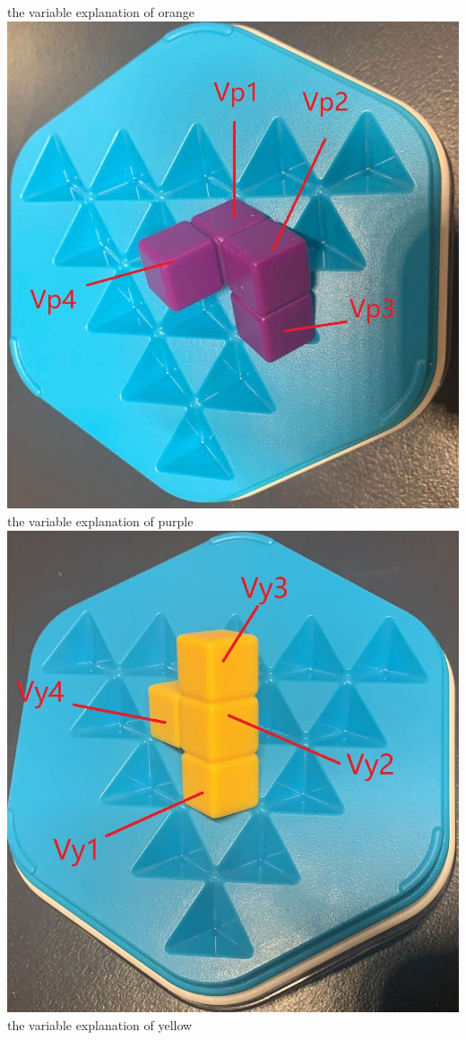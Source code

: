 \begin{center}
the variable explanation of orange\\
\includegraphics[scale=0.2]{figs/3Dpurple.jpg}\\
the variable explanation of purple\\
\includegraphics[scale=0.2]{figs/3Dyellow.jpg}\\
the variable explanation of yellow\\
\end{center}

